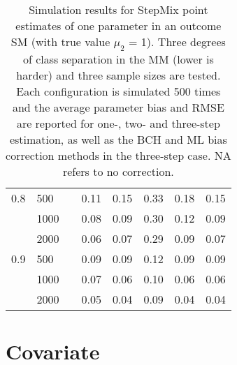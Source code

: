 \documentclass{article}
\begin{document}
\begin{table}[ht]
\begin{tabular}{lll |rrrrr}
  0.8       & 500  &        &   0.11 &   0.15 &   0.33 &    0.18 &   0.15 \\ 
            & 1000 &        &   0.08 &   0.09 &   0.30 &    0.12 &   0.09 \\ 
            & 2000 &        &   0.06 &   0.07 &   0.29 &    0.09 &   0.07 \\ 
  0.9       & 500  &        &   0.09 &   0.09 &   0.12 &    0.09 &   0.09 \\ 
            & 1000 &        &   0.07 &   0.06 &   0.10 &    0.06 &   0.06 \\ 
            & 2000 &        &   0.05 &   0.04 &   0.09 &    0.04 &   0.04 \\ 
   \hline
\end{tabular}

\caption{Simulation results for StepMix point estimates of one parameter in
  an outcome SM (with true value $\mu_2$ = 1). Three degrees of class separation
  in the MM (lower is harder) and three sample sizes are tested.
  Each configuration is simulated 500 times and the average parameter bias
  and RMSE are reported for one-, two- and three-step estimation, as well as
  the BCH and ML bias correction methods in the three-step case. NA refers to no
  correction.}
\end{table}


\newpage
\section{Covariate}
\end{document}
